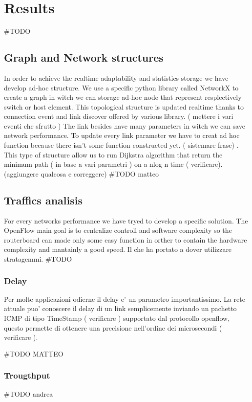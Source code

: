 \documentclass[conference,10pt]{IEEEtran}
\begin{document}
  
\section{Results}\label{sec:results}
\#TODO %
  \subsection{Graph and Network structures}
  In order to achieve the realtime adaptability and statistics storage we have develop ad-hoc structure.
  We use a specific python library called NetworkX \cite{networkx} to create a graph in witch we can storage ad-hoc node that represent 
  resplectively switch or host element.
  This topological structure is updated realtime thanks to connection event and link discover offered by various library. 
  ( mettere i vari eventi che sfrutto )
  The link besides have many parameters in witch we can save network performance. To update every link parameter we have to creat ad hoc function 
  because there isn't some function constructed yet. ( sistemare frase) .
  This type of structure allow us to run Dijkstra algorithm that return the minimum path ( in base a vari parametri ) on a nlog n time ( verificare).
  (aggiungere qualcosa e correggere)
  \#TODO matteo
  
  \subsection{Traffics analisis}
  For every networks performance we have tryed to develop a specific solution. The OpenFlow main goal is to centralize controll and software
  complexity so the routerboard can made only some easy function in orther to contain the hardware complexity and mantainly a good speed.
  Il che ha portato a dover utilizzare stratagemmi.
  \#TODO %
    \subsubsection{Delay}
    Per molte applicazioni odierne il delay e' un parametro importantissimo. 
    La rete attuale puo' conoscere il delay di un link semplicemente inviando un pachetto ICMP di tipo TimeStamp ( verificare ) 
    supportato dal protocollo openflow, questo permette di ottenere una precisione nell'ordine dei microsecondi ( verificare ).
    
    
    \#TODO MATTEO
    \subsubsection{Trougthput}
    \#TODO andrea
\end{document}
